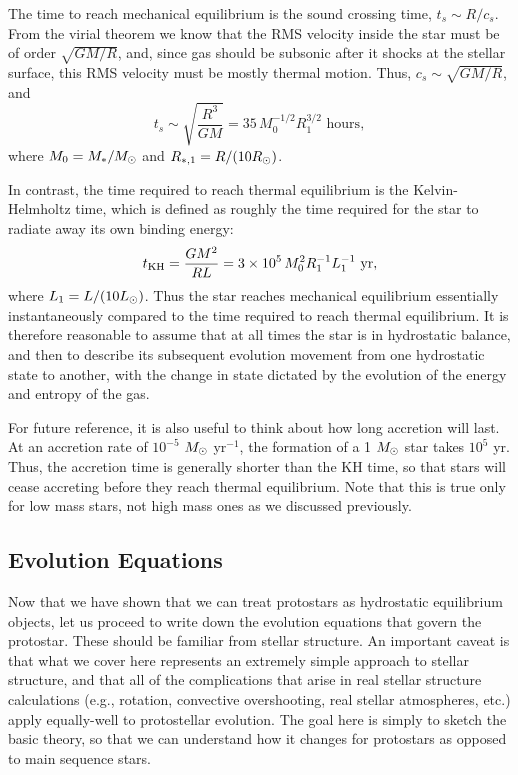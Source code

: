 The time to reach mechanical equilibrium is the sound crossing time, $t_s\sim R/c_s$. From the virial theorem we know that the RMS velocity inside the star must be of order $\sqrt{GM/R}$, and, since gas should be subsonic after it shocks at the stellar surface, this RMS velocity must be mostly thermal motion. Thus, $c_s\sim \sqrt{GM/R}$, and
\begin{equation}
t_s \sim \sqrt{\frac{R^3}{GM}} = 35\, M_0^{-1/2} R_1^{3/2}\mbox{ hours},
\end{equation}
where $M_0 = M_* / M_{\odot}$ and $R_{*,1} = R/(10R_{\odot})$.

In contrast, the time required to reach thermal equilibrium is the Kelvin-Helmholtz time, which is defined as roughly the time required for the star to radiate away its own binding energy:
\begin{equation}
t_{\rm KH} = \frac{GM^2}{RL} = 3\times 10^5\, M_0^2 R_1^{-1} L_1^{-1}\mbox{ yr},
\end{equation}
where $L_1 = L/(10 L_{\odot})$. Thus the star reaches mechanical equilibrium essentially instantaneously compared to the time required to reach thermal equilibrium. It is therefore reasonable to assume that at all times the star is in hydrostatic balance, and then to describe its subsequent evolution movement from one hydrostatic state to another, with the change in state dictated by the evolution of the energy and entropy of the gas. 

For future reference, it is also useful to think about how long accretion will last. At an accretion rate of $10^{-5}$ $M_{\odot}$ yr$^{-1}$, the formation of a 1 $M_{\odot}$ star takes $10^5$ yr. Thus, the accretion time is generally shorter than the KH time, so that stars will cease accreting before they reach thermal equilibrium. Note that this is true only for low mass stars, not high mass ones as we discussed previously.

\subsection{Evolution Equations}

Now that we have shown that we can treat protostars as hydrostatic equilibrium objects, let us proceed to write down the evolution equations that govern the protostar. These should be familiar from stellar structure. An important caveat is that what we cover here represents an extremely simple approach to stellar structure, and that all of the complications that arise in real stellar structure calculations (e.g., rotation, convective overshooting, real stellar atmospheres, etc.) apply equally-well to protostellar evolution. The goal here is simply to sketch the basic theory, so that we can understand how it changes for protostars as opposed to main sequence stars.

